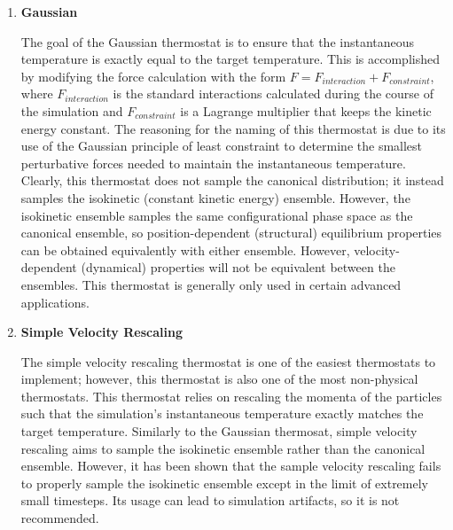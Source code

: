 \documentclass[9pt,bestpractices]{livecoms}
\begin{document}
\begin{enumerate}[listparindent=\parindent]

    \item \textbf{Gaussian}
        
        The goal of the Gaussian thermostat is to ensure that the instantaneous temperature is exactly equal to the target temperature.
        This is accomplished by modifying the force calculation with the form $F = F_{interaction} + F_{constraint}$, where $F_{interaction}$ is the standard interactions calculated during the course of the simulation and $F_{constraint}$ is a Lagrange multiplier that keeps the kinetic energy constant.
        The reasoning for the naming of this thermostat is due to its use of the Gaussian principle of least constraint to determine the smallest perturbative forces needed to maintain the instantaneous temperature\cite{thermostatAlgorithms2005}.
        Clearly, this thermostat does not sample the canonical distribution; it instead samples the isokinetic (constant kinetic energy) ensemble.
        However, the isokinetic ensemble samples the same configurational phase space as the canonical ensemble, so position-dependent (structural) equilibrium properties can be obtained equivalently with either ensemble\cite{Minary:2003:JChemPhys:Algorithms}.
        However, velocity-dependent (dynamical) properties will not be equivalent between the ensembles.
        This thermostat is generally only used in certain advanced applications\cite{Minary:2002:JChemPhysAlgorithms}.

    \item \textbf{Simple Velocity Rescaling}

        The simple velocity rescaling thermostat is one of the easiest thermostats to implement; however, this thermostat is also one of the most non-physical thermostats.
        This thermostat relies on rescaling the momenta of the particles such that the simulation's instantaneous temperature exactly matches the target temperature\cite{thermostatAlgorithms2005}.
        Similarly to the Gaussian thermosat, simple velocity rescaling aims to sample the isokinetic ensemble rather than the canonical ensemble.
        However, it has been shown that the sample velocity rescaling fails to properly sample the isokinetic ensemble except in the limit of extremely small timesteps\cite{Braun:2018:arXiv:Anomalous}.
        Its usage can lead to simulation artifacts, so it is not recommended\cite{Harvey:1998:JCompChem,Braun:2018:arXiv:Anomalous}.


\end{enumerate}
\end{document}
